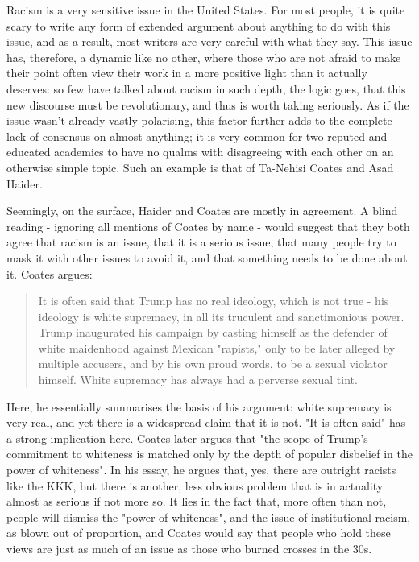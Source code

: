

Racism is a very sensitive issue in the United States. For most people, it is quite scary to write any form of extended argument about anything to do with this issue, and as a result, most writers are very careful with what they say. This issue has, therefore, a dynamic like no other, where those who are not afraid to make their point often view their work in a more positive light than it actually deserves: so few have talked about racism in such depth, the logic goes, that this new discourse must be revolutionary, and thus is worth taking seriously. As if the issue wasn't already vastly polarising, this factor further adds to the complete lack of consensus on almost anything; it is very common for two reputed and educated academics to have no qualms with disagreeing with each other on an otherwise simple topic. Such an example is that of Ta-Nehisi Coates and Asad Haider.

Seemingly, on the surface, Haider and Coates are mostly in agreement. A blind reading - ignoring all mentions of Coates by name - would suggest that they both agree that racism is an issue, that it is a serious issue, that many people try to mask it with other issues to avoid it, and that something needs to be done about it. Coates argues:

\begin{quote}
It is often said that Trump has no real ideology, which is not true - his ideology is white supremacy, in all its truculent and sanctimonious power. Trump inaugurated his campaign by casting himself as the defender of white maidenhood against Mexican "rapists," only to be later alleged by multiple accusers, and by his own proud words, to be a sexual violator himself. White supremacy has always had a perverse sexual tint. \cite{coates}
\end{quote}

Here, he essentially summarises the basis of his argument: white supremacy is very real, and yet there is a widespread claim that it is not. "It is often said" has a strong implication here. Coates later argues that "the scope of Trump's commitment to whiteness is matched only by the depth of popular disbelief in the power of whiteness". In his essay, he argues that, yes, there are outright racists like the KKK, but there is another, less obvious problem that is in actuality almost as serious if not more so. It lies in the fact that, more often than not, people will dismiss the "power of whiteness", and the issue of institutional racism, as blown out of proportion, and Coates would say that people who hold these views are just as much of an issue as those who burned crosses in the 30s.

